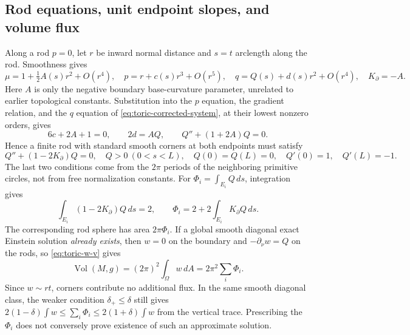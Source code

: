 \documentclass[a4paper,11pt]{article}
\numberwithin{equation}{section}
\theoremstyle{definition}
\newcommand{\Vol}{\operatorname{Vol}}
\begin{document}
\subsection{Rod equations, unit endpoint slopes, and volume flux}
Along a rod $p=0$, let $r$ be inward normal distance and $s=t$ arclength along the rod. Smoothness gives
\begin{equation}\label{eq:toric-edge-jets}
 \mu=1+\tfrac12 A(s)r^2+O(r^4),\quad
 p=r+c(s)r^3+O(r^5),\quad
 q=Q(s)+d(s)r^2+O(r^4),\quad K_\partial=-A.
\end{equation}
Here $A$ is only the negative boundary base-curvature parameter, unrelated to earlier topological constants.
Substitution into the $p$ equation, the gradient relation, and the $q$ equation of \eqref{eq:toric-corrected-system}, at their lowest nonzero orders, gives
\[
 6c+2A+1=0,\qquad 2d=AQ,\qquad Q''+(1+2A)Q=0.
\]
Hence a finite rod with standard smooth corners at both endpoints must satisfy
\begin{equation}\label{eq:toric-edge-ode}
 Q''+(1-2K_\partial)Q=0,\quad Q>0\ (0<s<L),\quad
 Q(0)=Q(L)=0,\quad Q'(0)=1,\quad Q'(L)=-1.
\end{equation}
The last two conditions come from the $2\pi$ periods of the neighboring primitive circles, not from free normalization constants.
For $\Phi_i=\int_{E_i}Q\,ds$, integration gives
\begin{equation}\label{eq:toric-rod-flux}
 \int_{E_i}(1-2K_\partial)Q\,ds=2,\qquad
 \Phi_i=2+2\int_{E_i}K_\partial Q\,ds.
\end{equation}
The corresponding rod sphere has area $2\pi\Phi_i$.
If a global smooth diagonal exact Einstein solution \emph{already exists}, then $w=0$ on the boundary and $-\partial_\nu w=Q$ on the rods, so \eqref{eq:toric-w-v} gives
\begin{equation}\label{eq:toric-flux-volume}
 \Vol(M,g)=(2\pi)^2\int_\Omega w\,dA
          =2\pi^2\sum_i\Phi_i.
\end{equation}
Since $w\sim rt$, corners contribute no additional flux.
In the same smooth diagonal class, the weaker condition $\delta_+\le\delta$ still gives
$2(1-\delta)\int w\le\sum_i\Phi_i\le2(1+\delta)\int w$ from the vertical trace.
Prescribing the $\Phi_i$ does not conversely prove existence of such an approximate solution.
\end{document}
